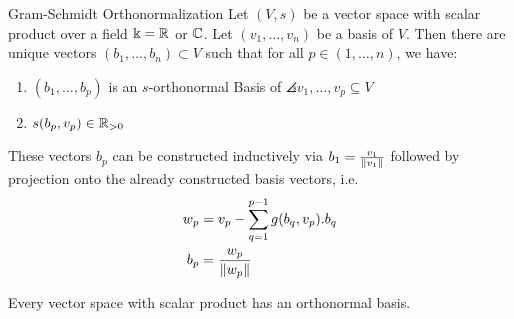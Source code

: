 \begin{importanttheorem}{Gram-Schmidt Orthonormalization}{}
	Let $(V,s)$ be a vector space with scalar product over a field $\Bbbk = \mathbb{R}$ or $\mathbb{C}$. Let $(v_1, \hdots, v_n)$ be a basis of $V$. Then there are unique vectors $(b_1, \hdots, b_n) \subset V$ such that for all $p \in (1, \hdots, n)$, we have:
	\begin{enumerate}
		\item $(b_1, \hdots, b_p)$ is an $s$-orthonormal Basis of $\angles{v_1, \hdots, v_p} \subseteq V$
		\item $s(b_p,v_p) \in \mathbb{R}_{> 0}$
	\end{enumerate}
	These vectors $b_p$ can be constructed inductively via $b_1 = \frac{v_1}{\norm{v_1}}$ followed by projection onto the already constructed basis vectors, i.e.
	\begin{align*}
		w_p &= v_p - \sum_{q = 1}^{p-1} g(b_q,v_p).b_q\\
		b_p &= \frac{w_p}{\norm{w_p}}
	\end{align*}
\end{importanttheorem}
\begin{corollary}
	Every vector space with scalar product has an orthonormal basis.
\end{corollary}

\clearpage
